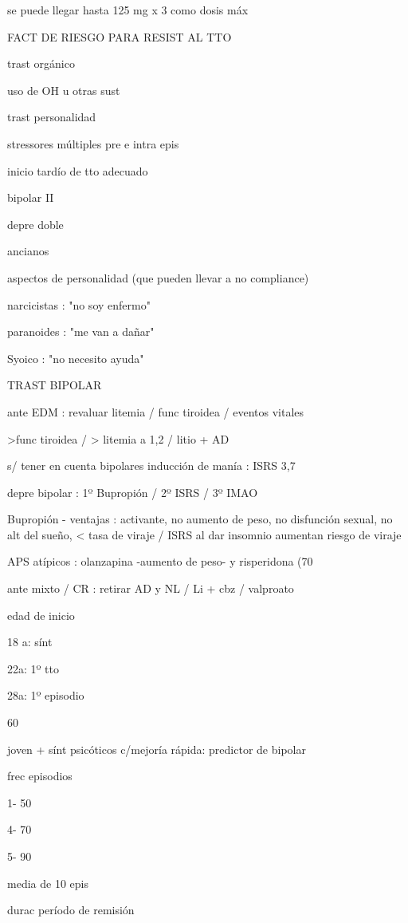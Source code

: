se puede llegar hasta 125 mg x 3 como dosis máx

FACT DE RIESGO PARA RESIST AL TTO

trast orgánico

uso de OH u otras sust

trast personalidad

stressores múltiples pre e intra epis

inicio tardío de tto adecuado

bipolar II

depre doble

ancianos

aspectos de personalidad (que pueden llevar a no compliance)

narcicistas : "no soy enfermo"

paranoides : "me van a dañar"

Syoico : "no necesito ayuda"

TRAST BIPOLAR

ante EDM : revaluar litemia / func tiroidea / eventos vitales

>func tiroidea / > litemia a 1,2 / litio + AD

s/ tener en cuenta bipolares inducción de manía : ISRS 3,7%

depre bipolar : 1º Bupropión / 2º ISRS / 3º IMAO

Bupropión - ventajas : activante, no aumento de peso, no disfunción sexual, no alt del sueño, < tasa de viraje / ISRS al dar insomnio aumentan riesgo de viraje

APS atípicos : olanzapina -aumento de peso- y risperidona (70%

ante mixto / CR : retirar AD y NL / Li + cbz / valproato

edad de inicio

18 a: sínt

22a: 1º tto

28a: 1º episodio

60%

joven + sínt psicóticos c/mejoría rápida: predictor de bipolar

frec episodios

1- 50%

4- 70%

5- 90%

media de 10 epis

durac período de remisión

